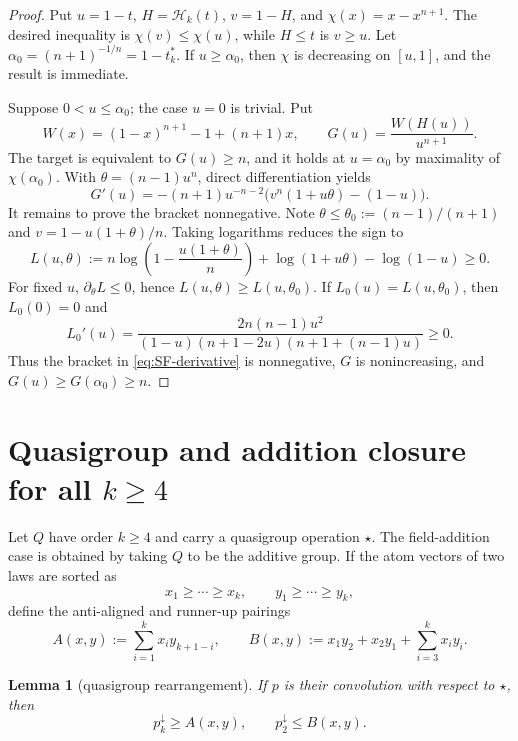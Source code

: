 \documentclass[11pt]{article}
\newtheorem{lemma}[theorem]{Lemma}
\theoremstyle{definition}
\theoremstyle{remark}
\newcommand{\down}{\downarrow}
\begin{document}
\begin{proof}
Put $u=1-t$, $H=\mathcal H_k(t)$, $v=1-H$, and
$\chi(x)=x-x^{n+1}$.  The desired inequality is $\chi(v)\le\chi(u)$,
while $H\le t$ is $v\ge u$.  Let $\alpha_0=(n+1)^{-1/n}=1-t_k^*$.  If
$u\ge\alpha_0$, then $\chi$ is decreasing on $[u,1]$, and the result is
immediate.

Suppose $0<u\le\alpha_0$; the case $u=0$ is trivial.  Put
\[
 W(x)=(1-x)^{n+1}-1+(n+1)x,\qquad
 G(u)=\frac{W(H(u))}{u^{n+1}}.
\]
The target is equivalent to $G(u)\ge n$, and it holds at $u=\alpha_0$ by
maximality of $\chi(\alpha_0)$.  With
$\theta=(n-1)u^{n}$, direct differentiation yields
\begin{equation}\label{eq:SF-derivative}
 G'(u)=-(n+1)u^{-n-2}\bigl(v^n(1+u\theta)-(1-u)\bigr).
\end{equation}
It remains to prove the bracket nonnegative.  Note
$\theta\le\theta_0:=(n-1)/(n+1)$ and
$v=1-u(1+\theta)/n$.  Taking logarithms reduces the sign to
\[
 L(u,\theta):=n\log\left(1-\frac{u(1+\theta)}n\right)
 +\log(1+u\theta)-\log(1-u)\ge0.
\]
For fixed $u$, $\partial_\theta L\le0$, hence
$L(u,\theta)\ge L(u,\theta_0)$.  If
$L_0(u)=L(u,\theta_0)$, then $L_0(0)=0$ and
\[
 L_0'(u)=\frac{2n(n-1)u^2}
 {(1-u)(n+1-2u)(n+1+(n-1)u)}\ge0.
\]
Thus the bracket in \eqref{eq:SF-derivative} is nonnegative, $G$ is
nonincreasing, and $G(u)\ge G(\alpha_0)\ge n$.
\end{proof}


\section{Quasigroup and addition closure for all
\texorpdfstring{$k\ge4$}{k >= 4}}
\label{sec:addition}

Let $Q$ have order $k\ge4$ and carry a quasigroup operation $\star$.
The field-addition case is obtained by taking $Q$ to be the additive group.
If the atom vectors of two laws are sorted as
\[
 x_1\ge\cdots\ge x_k,\qquad y_1\ge\cdots\ge y_k,
\]
define the anti-aligned and runner-up pairings
\begin{equation}\label{eq:add-AB}
 A(x,y):=\sum_{i=1}^k x_i y_{k+1-i},\qquad
 B(x,y):=x_1y_2+x_2y_1+\sum_{i=3}^k x_i y_i.
\end{equation}

\begin{lemma}[quasigroup rearrangement]\label{lem:add-rearrangement}
If $p$ is their convolution with respect to $\star$, then
\[
 p_k^\down\ge A(x,y),\qquad p_2^\down\le B(x,y).
\]
\end{lemma}
\end{document}
